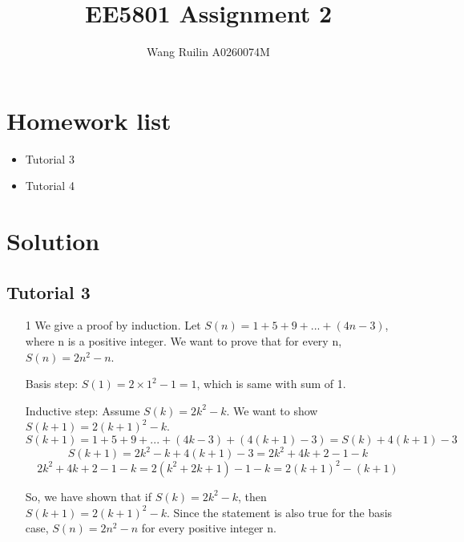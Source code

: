 \documentclass[a4paper]{article}
\title{EE5801 Assignment 2}
\author{Wang Ruilin A0260074M}
\begin{document}
\maketitle
\section{Homework list}

\begin{itemize}

\item Tutorial 3

\item Tutorial 4

\end{itemize}

\section{Solution}
\subsection{Tutorial 3}

\begin{enumerate}[Q1]

\item[1]
We give a proof by induction. 
Let $S(n)=1+5+9+...+(4n-3)$, where n is a positive integer.
We want to prove that for every n, $S(n)=2n^2-n$.


Basis step:
$S(1)=2 \times 1^2-1=1$, which is same with sum of 1. 


Inductive step:
Assume $S(k)=2k^2-k$. We want to show $S(k+1)=2(k+1)^2-k$. 
$$S(k+1)=1+5+9+...+(4k-3)+(4(k+1)-3)=S(k)+4(k+1)-3$$
$$S(k+1)=2k^2-k+4(k+1)-3=2k^2+4k+2-1-k$$
$$2k^2+4k+2-1-k=2(k^2+2k+1)-1-k=2(k+1)^2-(k+1)$$


So, we have shown that if $S(k)=2k^2-k$, then $S(k+1)=2(k+1)^2-k$. Since the statement is also true for the basis case, $S(n)=2n^2-n$ for every positive integer n.







\end{enumerate}
\end{document}
